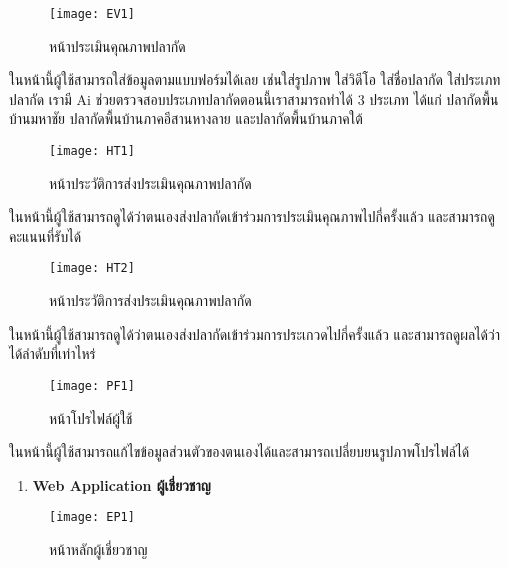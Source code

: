 \newpage

\begin{figure}[h]
	\centering
	\texttt{[image: EV1]}
	\caption{หน้าประเมินคุณภาพปลากัด}
\end{figure}

\indent ในหน้านี้ผู้ใช้สามารถใส่ข้อมูลตามแบบฟอร์มได้เลย เช่นใส่รูปภาพ ใส่วิดีโอ ใส่ชื่อปลากัด ใส่ประเภทปลากัด เรามี Ai ช่วยตรวจสอบประเภทปลากัดตอนนี้เราสามารถทำได้ 3 ประเภท ได้แก่ ปลากัดพื้นบ้านมหาชัย ปลากัดพื้นบ้านภาคอีสานหางลาย และปลากัดพื้นบ้านภาคใต้

\vspace{\baselineskip}

\begin{figure}[h]
	\centering
	\texttt{[image: HT1]}
	\caption{หน้าประวัติการส่งประเมินคุณภาพปลากัด}
\end{figure}

\indent ในหน้านี้ผู้ใช้สามารถดูได้ว่าตนเองส่งปลากัดเข้าร่วมการประเมินคุณภาพไปกี่ครั้งแล้ว และสามารถดูคะแนนที่รับได้ 

\newpage

\begin{figure}[h]
	\centering
	\texttt{[image: HT2]}
	\caption{หน้าประวัติการส่งประเมินคุณภาพปลากัด}
\end{figure}

\indent ในหน้านี้ผู้ใช้สามารถดูได้ว่าตนเองส่งปลากัดเข้าร่วมการประเกวดไปกี่ครั้งแล้ว และสามารถดูผลได้ว่าได้ลำดับที่เท่าไหร่

\vspace{\baselineskip}

\begin{figure}[h]
	\centering
	\texttt{[image: PF1]}
	\caption{หน้าโปรไฟล์ผู้ใช้}
\end{figure}

\indent ในหน้านี้ผู้ใช้สามารถแก้ไขข้อมูลส่วนตัวของตนเองได้และสามารถเปลี่ยบยนรูปภาพโปรไฟล์ได้

\newpage
	
	
\begin{sloppypar}
	\begin{enumerate}[start=2]  %
		\item \textbf{Web Application ผู้เชี่ยวชาญ}
	\end{enumerate}
\end{sloppypar}

\begin{figure}[h]
	\centering
	\texttt{[image: EP1]}
	\caption{หน้าหลักผู้เชี่ยวชาญ}
\end{figure}

